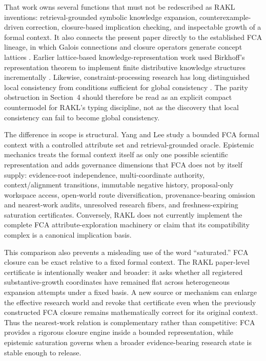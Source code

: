\documentclass[11pt]{article}
\begin{document}
That work owns several functions that must not be redescribed as RAKL inventions: retrieval-grounded symbolic knowledge expansion, counterexample-driven correction, closure-based implication checking, and inspectable growth of a formal context. It also connects the present paper directly to the established FCA lineage, in which Galois connections and closure operators generate concept lattices \cite{ganter1999}. Earlier lattice-based knowledge-representation work used Birkhoff's representation theorem to implement finite distributive knowledge structures incrementally \cite{oles2000}. Likewise, constraint-processing research has long distinguished local consistency from conditions sufficient for global consistency \cite{dechter1992}. The parity obstruction in Section~4 should therefore be read as an explicit compact countermodel for RAKL's typing discipline, not as the discovery that local consistency can fail to become global consistency.

The difference in scope is structural. Yang and Lee study a bounded FCA formal context with a controlled attribute set and retrieval-grounded oracle. Epistemic mechanics treats the formal context itself as only one possible scientific representation and adds governance dimensions that FCA does not by itself supply: evidence-root independence, multi-coordinate authority, context/alignment transitions, immutable negative history, proposal-only workspace access, open-world route diversification, provenance-bearing omission and nearest-work audits, unresolved research fibers, and freshness-expiring saturation certificates. Conversely, RAKL does not currently implement the complete FCA attribute-exploration machinery or claim that its compatibility complex is a canonical implication basis.

This comparison also prevents a misleading use of the word ``saturated.'' FCA closure can be exact relative to a fixed formal context. The RAKL paper-level certificate is intentionally weaker and broader: it asks whether all registered substantive-growth coordinates have remained flat across heterogeneous expansion attempts under a fixed basis. A new source or mechanism can enlarge the effective research world and revoke that certificate even when the previously constructed FCA closure remains mathematically correct for its original context. Thus the nearest-work relation is complementary rather than competitive: FCA provides a rigorous closure engine inside a bounded representation, while epistemic saturation governs when a broader evidence-bearing research state is stable enough to release.
\end{document}
